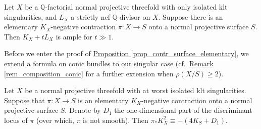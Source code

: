 \begin{prop}%
\label{prop_contr_surface_elementary}
Let $X$ be a $\mathbb{Q}$-factorial normal projective threefold with only isolated  klt singularities,  and $L_X$ a strictly nef $\mathbb{Q}$-divisor on $X$.
Suppose  there is an elementary  $K_X$-negative contraction  $\pi:X\to S$ onto a normal projective surface $S$.
Then $K_X+tL_X$ is ample for $t\gg 1$.
\end{prop}


Before we enter the proof of {\hyperref[prop_contr_surface_elementary]{Proposition   \ref*{prop_contr_surface_elementary}}}, we extend a formula on conic bundles to  our singular case (cf.~{\hyperref[rem_composition_conic]{Remark  \ref*{rem_composition_conic}}} for a further extension  when $\rho(X/S)\geqslant 2$).

\begin{lemme}\label{lem_conic_miy}
Let $X$ be a normal projective threefold with at worst isolated klt singularities.
Suppose that $\pi:X\to S$ is an elementary  $K_X$-negative contraction  onto a normal projective surface $S$.
Denote by $D_1$ the one-dimensional part of the discriminant locus of $\pi$ (over which, $\pi$ is not smooth).
Then $\pi_*K_X^2\equiv -(4K_S+D_1)$.
\end{lemme}

